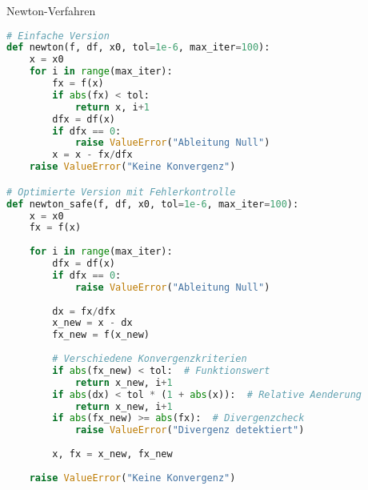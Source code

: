 \begin{examplecode}{Newton-Verfahren}
\begin{lstlisting}[language=Python, style=basesmol]
# Einfache Version
def newton(f, df, x0, tol=1e-6, max_iter=100):
    x = x0
    for i in range(max_iter):
        fx = f(x)
        if abs(fx) < tol:
            return x, i+1
        dfx = df(x)
        if dfx == 0:
            raise ValueError("Ableitung Null")
        x = x - fx/dfx
    raise ValueError("Keine Konvergenz")

# Optimierte Version mit Fehlerkontrolle
def newton_safe(f, df, x0, tol=1e-6, max_iter=100):
    x = x0
    fx = f(x)
    
    for i in range(max_iter):
        dfx = df(x)
        if dfx == 0:
            raise ValueError("Ableitung Null")
            
        dx = fx/dfx
        x_new = x - dx
        fx_new = f(x_new)
        
        # Verschiedene Konvergenzkriterien
        if abs(fx_new) < tol:  # Funktionswert
            return x_new, i+1
        if abs(dx) < tol * (1 + abs(x)):  # Relative Aenderung
            return x_new, i+1
        if abs(fx_new) >= abs(fx):  # Divergenzcheck
            raise ValueError("Divergenz detektiert")
            
        x, fx = x_new, fx_new
        
    raise ValueError("Keine Konvergenz")
\end{lstlisting}
\end{examplecode}



